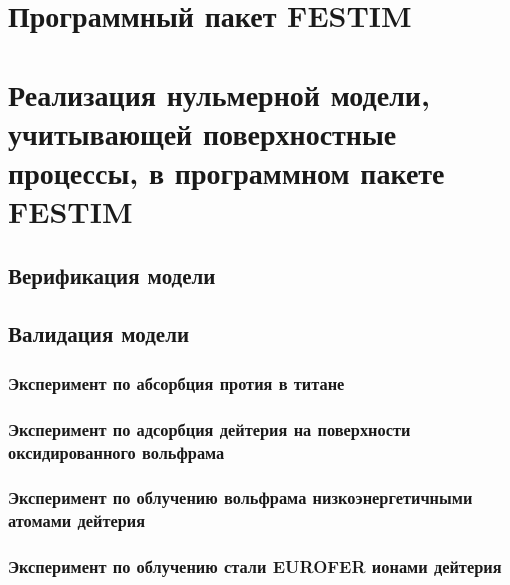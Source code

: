 \section{Программный пакет FESTIM}\label{sec:ch2/sec2}

\section{Реализация нульмерной модели, учитывающей поверхностные процессы, в программном пакете FESTIM}\label{sec:ch2/sec3}
\subsection{Верификация модели}\label{sec:ch2/sec3/subsec1}
\subsection{Валидация модели}\label{sec:ch2/sec3/subsec2}
\subsubsection{Эксперимент по абсорбция протия в титане}\label{sec:ch2/sec3/subsec2/subsubsec1}
\subsubsection{Эксперимент по адсорбция дейтерия на поверхности оксидированного вольфрама}\label{sec:ch2/sec3/subsec2/subsubsec2}
\subsubsection{Эксперимент по облучению вольфрама низкоэнергетичными атомами дейтерия}\label{sec:ch2/sec2/subsec3/subsubsec3}
\subsubsection{Эксперимент по облучению стали EUROFER ионами дейтерия}\label{sec:ch2/sec2/subsec/subsubsec4}

\section{}

\FloatBarrier
